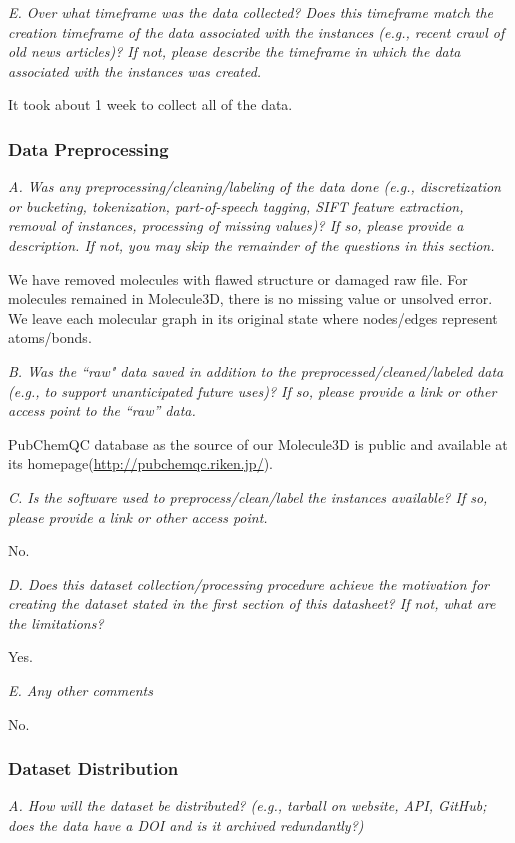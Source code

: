 \documentclass{article}
\begin{document}
\textit{E. Over what timeframe was the data collected? Does this timeframe match the creation timeframe of the data associated with the instances (e.g., recent crawl of old news articles)? If not, please describe the timeframe in which the data associated with the instances was created.}

It took about 1 week to collect all of the data.


\subsubsection{Data Preprocessing}

\textit{A. Was any preprocessing/cleaning/labeling of the data done (e.g., discretization or bucketing, tokenization, part-of-speech tagging, SIFT feature extraction, removal of instances, processing of missing values)? If so, please provide a description. If not, you may skip the remainder of the questions in this section.}

We have removed molecules with flawed structure or damaged raw file. For molecules remained in Molecule3D, there is no missing value or unsolved error. We leave each molecular graph in its original state where nodes/edges represent atoms/bonds.

\textit{B. Was the ``raw" data saved in addition to the preprocessed/cleaned/labeled data (e.g., to support unanticipated future uses)? If so, please provide a link or other access point to the “raw” data.}

PubChemQC database as the source of our Molecule3D is public and available at its homepage(\url{http://pubchemqc.riken.jp/}).

\textit{C. Is the software used to preprocess/clean/label the instances available? If so, please provide a link or other access point.}

No.

\textit{D. Does this dataset collection/processing procedure achieve the motivation for creating the dataset stated in the first section of this datasheet? If not, what are the limitations?}

Yes.

\textit{E. Any other comments}

No.

\subsubsection{Dataset Distribution}

\textit{A. How will the dataset be distributed? (e.g., tarball on website, API, GitHub; does the data have a DOI and is it archived redundantly?)}
\end{document}

